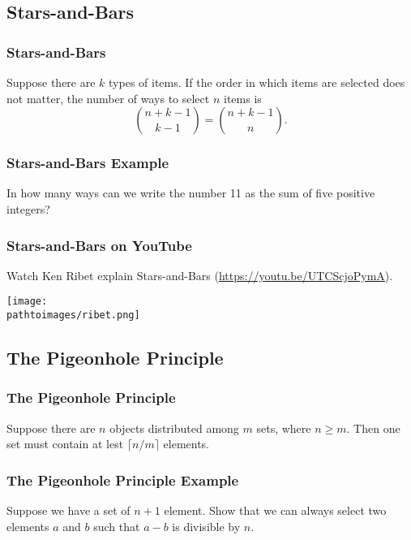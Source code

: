 \documentclass{beamer}
\newcommand{\pathtoimages}{/Users/charlesrambo/Desktop/Bootcamp24/Images}
\begin{document}
\subsection{Stars-and-Bars}

\begin{frame}
\frametitle{Stars-and-Bars}

\begin{Theorem}
Suppose there are $k$ types of items. If the order in which items are selected does not matter, the number of ways to select $n$ items is
$$
{n + k - 1\choose k - 1} = {n + k - 1\choose n}.
$$
\end{Theorem}
\end{frame}

\begin{frame}[t]
\frametitle{Stars-and-Bars Example}
\begin{Example}
In how many ways can we write the number 11 as the sum of five positive integers?
\end{Example}
\end{frame}

\begin{frame}
\frametitle{Stars-and-Bars on YouTube}
\small 
Watch Ken Ribet explain Stars-and-Bars (\url{https://youtu.be/UTCScjoPymA}).
\begin{center}
\texttt{[image: \\pathtoimages/ribet.png]}
\end{center}

\end{frame}

\subsection{The Pigeonhole Principle}

\begin{frame}
\frametitle{The Pigeonhole Principle}

\begin{Theorem}
Suppose there are $n$ objects distributed among $m$ sets, where $n \geq m$. Then one set must contain at lest $\lceil n/m \rceil$ elements.
\end{Theorem}
\end{frame}

\begin{frame}[t]
\frametitle{The Pigeonhole Principle Example}
\begin{Example}
Suppose we have a set of $n + 1$ element. Show that we can always select two elements $a$ and $b$ such that $a - b$ is divisible by $n$.
\end{Example}

\end{frame}
\end{document}
